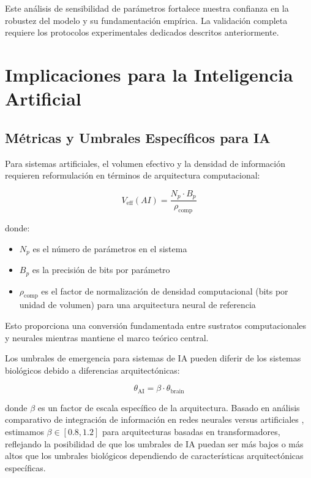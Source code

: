 \documentclass[12pt]{article}
\begin{document}
Este análisis de sensibilidad de parámetros fortalece nuestra confianza en la robustez del modelo y su fundamentación empírica. La validación completa requiere los protocolos experimentales dedicados descritos anteriormente.

\section{Implicaciones para la Inteligencia Artificial}

\subsection{Métricas y Umbrales Específicos para IA}

Para sistemas artificiales, el volumen efectivo y la densidad de información requieren reformulación en términos de arquitectura computacional:

\begin{equation}
V_{\text{eff}}(AI) = \frac{N_p \cdot B_p}{\rho_{\text{comp}}}
\end{equation}

donde:
\begin{itemize}
    \item $N_p$ es el número de parámetros en el sistema
    \item $B_p$ es la precisión de bits por parámetro
    \item $\rho_{\text{comp}}$ es el factor de normalización de densidad computacional (bits por unidad de volumen) para una arquitectura neural de referencia
\end{itemize}

Esto proporciona una conversión fundamentada entre sustratos computacionales y neurales mientras mantiene el marco teórico central.

Los umbrales de emergencia para sistemas de IA pueden diferir de los sistemas biológicos debido a diferencias arquitectónicas:

\begin{equation}
\theta_{\text{AI}} = \beta \cdot \theta_{\text{brain}}
\end{equation}

donde $\beta$ es un factor de escala específico de la arquitectura. Basado en análisis comparativo de integración de información en redes neurales versus artificiales \cite{tononi2016,oizumi2014}, estimamos $\beta \in [0.8, 1.2]$ para arquitecturas basadas en transformadores, reflejando la posibilidad de que los umbrales de IA puedan ser más bajos o más altos que los umbrales biológicos dependiendo de características arquitectónicas específicas.
\end{document}
